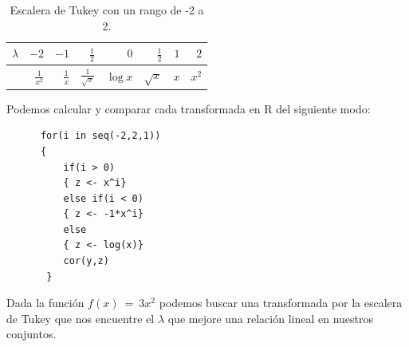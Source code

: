 \documentclass[]{article}
\begin{document}
\begin{table}[hbt!]
\begin{center}
 \begin{tabular}{c|r|r|r|r|r|r|r}
    $\lambda$ & $-2$ & $-1$ & $\frac{1}{2}$ & $0$ & $\frac{1}{2}$ & $1$ & $2$\\
   \hline
    & $\frac{1}{x^2}$ & $\frac{1}{x}$ & $\frac{1}{\sqrt{x}}$ & $\log x$ & $\sqrt{x}$ & $x$ & $x^2$ \\
   \hline
 \end{tabular}
 \caption{Escalera de Tukey con un rango de -2 a 2.}
 
\label{t1}
\end{center}
\end{table}

Podemos calcular y comparar cada transformada en R del siguiente modo:
  \begin{lstlisting}
      for(i in seq(-2,2,1))
      {
          if(i > 0)
          { z <- x^i}
          else if(i < 0)
          { z <- -1*x^i}
          else
          { z <- log(x)}
          cor(y,z)
       }
   \end{lstlisting}

Dada la función $f\left(x\right)\ =\ 3x^2$ podemos buscar una transformada por la escalera de Tukey que nos encuentre el $\lambda$ que mejore una relación lineal en nuestros conjuntos.
\end{document}
